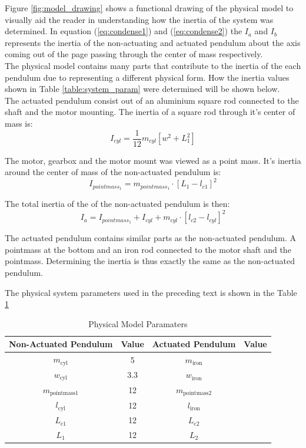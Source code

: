 Figure \ref{fig:model_drawing} shows a functional drawing of the physical model to visually aid the reader in understanding how the inertia of the system was determined. In equation (\ref{eq:condense1}) and (\ref{eq:condense2}) the $I_{a}$ and $I_{b}$ represents the inertia of the non-actuating and actuated pendulum about the axis coming out of the page passing through the center of mass respectively.\\

The physical model contains many parts that contribute to the inertia of the each pendulum due to representing a different physical form. How the inertia values shown in Table \ref{table:system_param} were determined will be shown below.\\

The actuated pendulum consist out of an aluminium square rod connected to the shaft and the motor mounting. The inertia of a square rod through it's center of mass is: $$ I_{cyl} = \frac{1}{12}m_{cyl}[w^2+L^2_{1}]$$

The motor, gearbox and the motor mount was viewed as a point mass. It's inertia around the center of mass of the non-actuated pendulum is: $$I_{pointmass_1} = m_{pointmass_1}\cdot[L_{1}-l_{c1}]^2 $$

The total inertia of the of the non-actuated pendulum is then: $$ I_{a} =I_{pointmass_1} +  I_{cyl} + m_{cyl}\cdot[l_{c2}-l_{cyl}]^2 $$

The actuated pendulum contains similar parts as the non-actuated pendulum. A pointmass at the bottom and an iron rod connected to the motor shaft and the pointmass. Determining the inertia is thus exactly the same as the non-actuated pendulum.

The physical system parameters used in the preceding text is shown in the Table \ref{table:model_param}


\begin{table}[]
	\centering
	\begin{tabular}{|c|c|c|c|}
		\hline
		Non-Actuated Pendulum& Value & Actuated Pendulum & Value \\
		\hline
		\hline
		$m_{\text{cyl}}$ & \SI{5}{} & $m_{\text{iron}}$ &\\
		\hline
		$w_{\text{cyl}}$ & \SI{3.3}{}& $w_{\text{iron}}$& \\
		\hline
		$m_{\text{pointmass1}}$ & \SI{12}{}& $m_{\text{pointmass2}}$& \\
		\hline
		$l_{\text{cyl}}$ & \SI{12}{}& $l_{\text{iron}}$& \\
		\hline
		$L_{\text{c1}}$ & \SI{12}{} & $L_{\text{c2}}$&\\
		\hline
		$L_{1}$ & \SI{12}{}& $L_{2}$& \\
		\hline
	\end{tabular}
	\caption{Physical Model Paramaters}
	\label{table:model_param}
\end{table}

